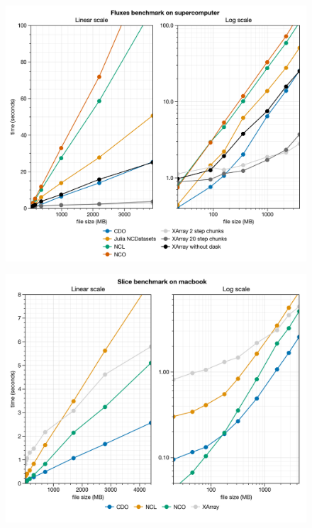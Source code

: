 \documentclass[aspectratio=169]{beamer}
\begin{document}
\begin{frame}[plain]
  \begin{figure}
    \centering
    \includegraphics[height=1.1\textheight]{fluxes_60lev_cheyenne4.png}
  \end{figure}
\end{frame}

\begin{frame}[plain]
  \begin{figure}
    \centering
    \includegraphics[height=1.1\textheight]{slices_60lev_uriah.png}
  \end{figure}
\end{frame}
\end{document}
